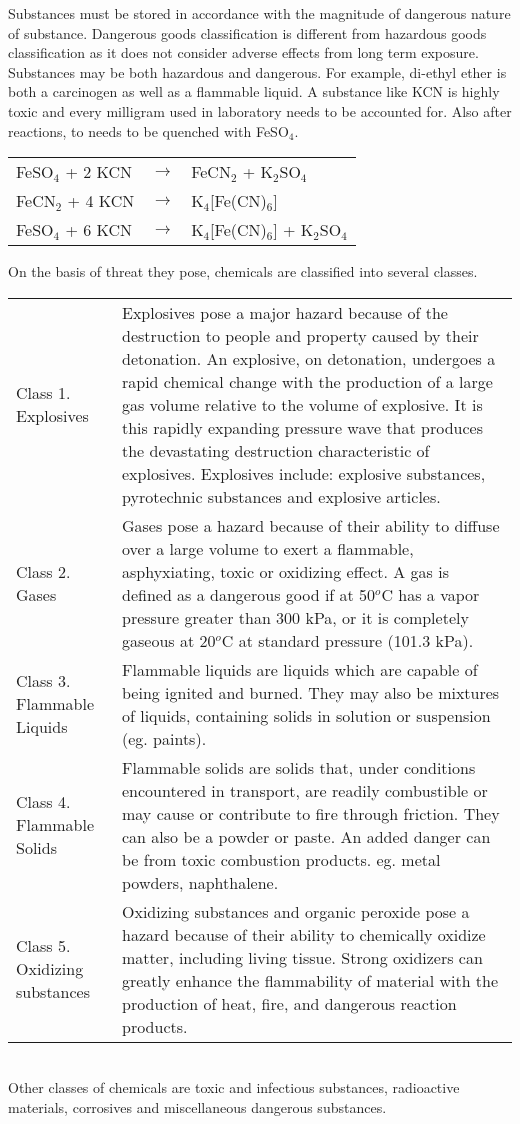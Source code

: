 \documentclass[pdftex,12pt,a4paper]{article}
\begin{document}
Substances must be stored in accordance with the magnitude of dangerous nature of substance. Dangerous goods classification is different from hazardous goods classification as it does not consider adverse effects from long term exposure. Substances may be both hazardous and dangerous. For example, di-ethyl ether is both a carcinogen as well as a flammable liquid. A substance like KCN is highly toxic and every milligram used in laboratory needs to be accounted for. Also after reactions, to needs to be quenched with FeSO$_4$.
\begin{center}
\begin{tabular}{lll}
FeSO$_4$ + 2 KCN &$\rightarrow$&FeCN$_2$ + K$_2$SO$_4$\\
FeCN$_2$ + 4 KCN &$\rightarrow$&K$_4$[Fe(CN)$_6$]\\
\hline
FeSO$_4$ + 6 KCN &$\rightarrow$&K$_4$[Fe(CN)$_6$] + K$_2$SO$_4$\\
\hline
\end{tabular}
\end{center}
On the basis of threat they pose, chemicals are classified into several classes.
\begin{tabular}{p{55pt}p{350pt}}
Class 1. Explosives& Explosives pose a major hazard because of the destruction to people and property caused by their detonation. An explosive, on detonation, undergoes a rapid chemical change with the production of a large gas volume relative to the volume of explosive. It is this rapidly expanding pressure wave that produces the devastating destruction characteristic of explosives. Explosives include: explosive substances, pyrotechnic substances and explosive articles.\\
Class 2. Gases & Gases pose a hazard because of their ability to diffuse over a large volume to exert a flammable, asphyxiating, toxic or oxidizing effect.
A gas is defined as a dangerous good if at 50$^o$C has a vapor pressure greater than 300 kPa, or it is completely gaseous at 20$^o$C at standard pressure (101.3 kPa).\\
Class 3. Flammable Liquids & Flammable liquids are liquids which are capable of being ignited and burned. They may also be mixtures of liquids, containing solids in solution or suspension (eg. paints).\\
Class 4. Flammable Solids& Flammable solids are solids that, under conditions encountered in transport, are readily combustible or may cause or contribute to fire through friction. They can also be a powder or paste. An added danger can be from toxic combustion products. eg. metal powders, naphthalene.\\
Class 5. Oxidizing substances&Oxidizing substances and organic peroxide pose a hazard because of their ability to chemically oxidize matter, including living tissue. Strong oxidizers can greatly enhance the flammability of material with the production of heat, fire, and dangerous reaction products.
\end{tabular}
\\

Other classes of chemicals are toxic and infectious substances, radioactive materials, corrosives and miscellaneous dangerous substances.
\end{document}
